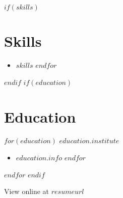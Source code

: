 \documentclass[$fontsize$, letterpaper]{article}
\begin{document}
\begin{multicols}{2}
$if(skills)$
\section*{Skills}
\begin{itemize}
    $for(skills)$
      \item $skills$
    $endfor$
\end{itemize}
$endif$
\columnbreak
$if(education)$
\section*{Education}
\noindent
$for(education)$
\textbf{$education.institute$}
\begin{itemize}
    $for(education.info)$
    \item $education.info$
    $endfor$
\end{itemize}
$endfor$
$endif$
\end{multicols}

\vspace{0.05cm}
\hspace*{-1.5cm}\footnotesize{View online at \href{http://$resumeurl$}{$resumeurl$}}
\end{document}
